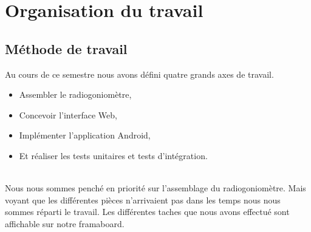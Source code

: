 
\chapter{Organisation du travail}


\section{Méthode de travail}

Au cours de ce semestre nous avons défini quatre grands axes de travail. 

\begin{itemize}
\item Assembler le radiogoniomètre,
\item Concevoir l'interface Web,
\item Implémenter l'application Android,
\item Et réaliser les tests unitaires et tests d'intégration.

\end{itemize}
~\\

Nous nous sommes penché en priorité sur l'assemblage du radiogoniomètre. Mais voyant que les différentes pièces n'arrivaient pas dans les temps nous nous sommes réparti le travail. Les différentes taches que nous avons effectué sont affichable sur notre framaboard. 



